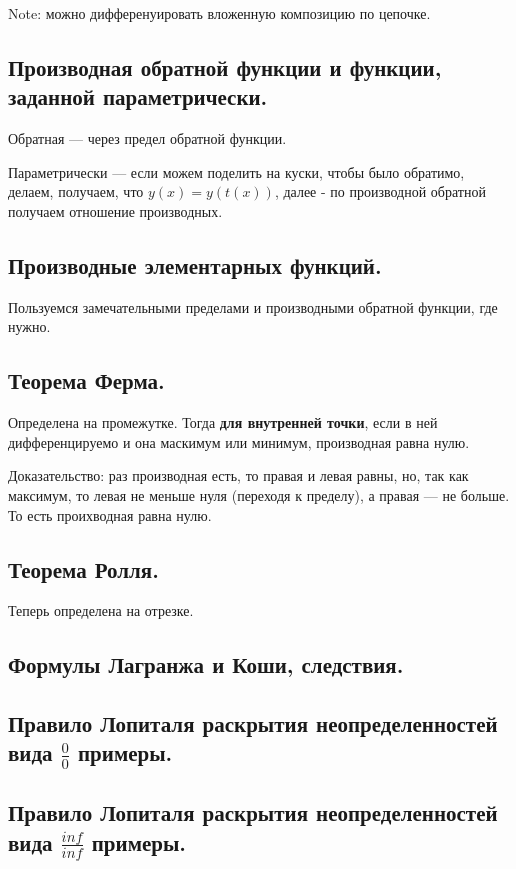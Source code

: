 \documentclass[12pt, a4paper]{article}
\begin{document}
Note: можно дифференуировать вложенную композицию по цепочке.

\subsection{Производная обратной функции и функции, заданной параметрически.}

Обратная — через предел обратной функции.

Параметрически — если можем поделить на куски, чтобы было обратимо, делаем, получаем, что
$y(x) = y(t(x))$, далее - по производной обратной получаем отношение производных.

\subsection{Производные элементарных функций.}

Пользуемся замечательными пределами и производными обратной функции, где нужно.

\subsection{Теорема Ферма.}

Определена на промежутке. Тогда \textbf{для внутренней точки},
если в ней дифференцируемо и она маскимум или минимум, производная равна нулю.

Доказательство: раз производная есть, то правая и левая равны, 
но, так как максимум, то левая не меньше нуля (переходя к пределу), а правая — не больше.
То есть проихводная равна нулю.


\subsection{Теорема Ролля.}

Теперь определена на отрезке.


\subsection{Формулы Лагранжа и Коши, следствия.}

\subsection{Правило Лопиталя раскрытия неопределенностей вида $\frac{0}{0}$ примеры.}

\subsection{Правило Лопиталя раскрытия неопределенностей вида $\frac{inf}{inf}$ примеры.}
\end{document}
